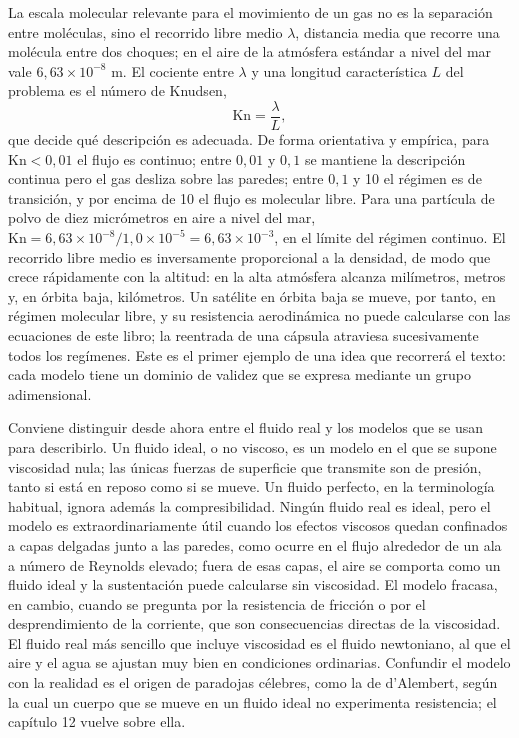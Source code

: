 \documentclass[10pt,openany]{book}
\begin{document}
La escala molecular relevante para el movimiento de un gas no es la separación entre moléculas, sino el recorrido libre medio \(\lambda\), distancia media que recorre una molécula entre dos choques; en el aire de la atmósfera estándar a nivel del mar vale \(6{,}63\times 10^{-8}\) m. El cociente entre \(\lambda\) y una longitud característica \(L\) del problema es el número de Knudsen,
\begin{equation}
\mathrm{Kn} = \frac{\lambda}{L}, \label{eq:c03-knudsen}
\end{equation}
que decide qué descripción es adecuada. De forma orientativa y empírica, para \(\mathrm{Kn} < 0{,}01\) el flujo es continuo; entre \(0{,}01\) y \(0{,}1\) se mantiene la descripción continua pero el gas desliza sobre las paredes; entre \(0{,}1\) y 10 el régimen es de transición, y por encima de 10 el flujo es molecular libre. Para una partícula de polvo de diez micrómetros en aire a nivel del mar, \(\mathrm{Kn} = 6{,}63\times 10^{-8}/1{,}0\times 10^{-5} = 6{,}63\times 10^{-3}\), en el límite del régimen continuo. El recorrido libre medio es inversamente proporcional a la densidad, de modo que crece rápidamente con la altitud: en la alta atmósfera alcanza milímetros, metros y, en órbita baja, kilómetros. Un satélite en órbita baja se mueve, por tanto, en régimen molecular libre, y su resistencia aerodinámica no puede calcularse con las ecuaciones de este libro; la reentrada de una cápsula atraviesa sucesivamente todos los regímenes. Este es el primer ejemplo de una idea que recorrerá el texto: cada modelo tiene un dominio de validez que se expresa mediante un grupo adimensional.

Conviene distinguir desde ahora entre el fluido real y los modelos que se usan para describirlo. Un fluido ideal, o no viscoso, es un modelo en el que se supone viscosidad nula; las únicas fuerzas de superficie que transmite son de presión, tanto si está en reposo como si se mueve. Un fluido perfecto, en la terminología habitual, ignora además la compresibilidad. Ningún fluido real es ideal, pero el modelo es extraordinariamente útil cuando los efectos viscosos quedan confinados a capas delgadas junto a las paredes, como ocurre en el flujo alrededor de un ala a número de Reynolds elevado; fuera de esas capas, el aire se comporta como un fluido ideal y la sustentación puede calcularse sin viscosidad. El modelo fracasa, en cambio, cuando se pregunta por la resistencia de fricción o por el desprendimiento de la corriente, que son consecuencias directas de la viscosidad. El fluido real más sencillo que incluye viscosidad es el fluido newtoniano, al que el aire y el agua se ajustan muy bien en condiciones ordinarias. Confundir el modelo con la realidad es el origen de paradojas célebres, como la de d'Alembert, según la cual un cuerpo que se mueve en un fluido ideal no experimenta resistencia; el capítulo 12 vuelve sobre ella.
\end{document}
